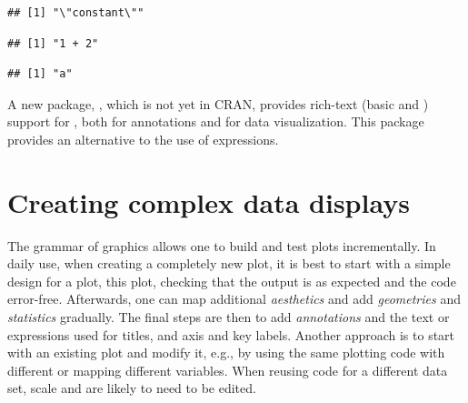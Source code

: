 \documentclass[krantz2]{krantz}\usepackage{knitr}
\begin{document}
\begin{knitrout}\footnotesize
{}\color{fgcolor}\begin{kframe}
\begin{alltt}
 \hlkwb{<-} \hlstd{(}\hlstd{) \{}
  \hlstd{(}\hlstd{(}
\hlstd{\}}

 \hlkwb{<-} 

\hlstd{(}\hlstd{)}
\end{alltt}
\begin{verbatim}
## [1] "\"constant\""
\end{verbatim}
\begin{alltt}
\hlstd{(} \hlopt{+} \hlstd{)}
\end{alltt}
\begin{verbatim}
## [1] "1 + 2"
\end{verbatim}
\begin{alltt}
\end{alltt}
\begin{verbatim}
## [1] "a"
\end{verbatim}
\end{kframe}
\end{knitrout}

\begin{infobox}
A new package, , which is not yet in CRAN, provides rich-text (basic  and ) support for \ggplot, both for annotations and for data visualization. This package provides an alternative to the use of \Rlang expressions.
\end{infobox}

\section{Creating complex data displays}\label{sec:plot:composition}

The grammar of graphics allows one to build and test plots incrementally. In daily use, when creating a completely new plot, it is best to start with a simple design for a plot,  this plot, checking that the output is as expected and the code error-free. Afterwards, one can map additional \emph{aesthetics} and add \emph{geometries} and \emph{statistics} gradually. The final steps are then to add \emph{annotations} and the text or expressions used for titles, and axis and key labels. Another approach is to start with an existing plot and modify it, e.g.,  by using the same plotting code with different  or mapping different variables. When reusing code for a different data set, scale  and  are likely to need to be edited.
\end{document}
